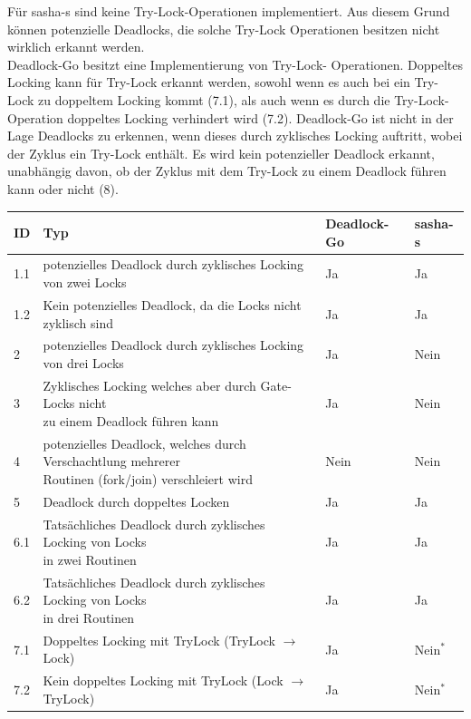 Für sasha-s sind keine Try-Lock-Operationen implementiert. Aus diesem Grund 
können potenzielle Deadlocks, die solche Try-Lock Operationen besitzen nicht 
wirklich erkannt werden.\\Deadlock-Go besitzt eine Implementierung von Try-Lock-
Operationen. Doppeltes Locking kann für Try-Lock erkannt werden, sowohl wenn 
es auch bei ein Try-Lock zu doppeltem Locking kommt (7.1), als auch wenn es
durch die Try-Lock-Operation doppeltes Locking verhindert wird (7.2). Deadlock-Go
ist nicht in der Lage Deadlocks zu erkennen, wenn dieses durch zyklisches Locking 
auftritt, wobei der Zyklus ein Try-Lock enthält. Es wird kein potenzieller
Deadlock erkannt, unabhängig davon, ob der Zyklus mit dem Try-Lock zu einem  
Deadlock führen kann oder nicht (8).


\begin{table}[H]
\centering
\begin{tabular}{|l|l|l|l|}
    \hline
    \textbf{ID} & \textbf{Typ} & \textbf{Deadlock-Go} & \textbf{sasha-s} \\ \hline
    1.1 & potenzielles Deadlock durch zyklisches Locking von zwei Locks & Ja & Ja \\ \hline
    1.2 & Kein potenzielles Deadlock, da die Locks nicht zyklisch sind & Ja & Ja \\ \hline
    2 & potenzielles Deadlock durch zyklisches Locking von drei Locks & Ja & Nein \\ \hline
    3 & \makecell[l]{Zyklisches Locking welches aber durch Gate-Locks nicht\\zu einem Deadlock führen kann} & Ja & Nein \\ \hline
    4 & \makecell[l]{potenzielles Deadlock, welches durch Verschachtlung mehrerer\\Routinen (fork/join) verschleiert wird} & Nein & Nein \\ \hline
    5 & Deadlock durch doppeltes Locken & Ja & Ja \\ \hline
    6.1 & \makecell[l]{Tatsächliches Deadlock durch zyklisches Locking von Locks\\in zwei Routinen} & Ja & Ja \\ \hline
    6.2 & \makecell[l]{Tatsächliches Deadlock durch zyklisches Locking von Locks\\in drei Routinen} & Ja & Ja \\ \hline
    7.1 & Doppeltes Locking mit TryLock (TryLock $\to$ Lock) & Ja & Nein$^*$ \\ \hline
    7.2 & Kein doppeltes Locking mit TryLock (Lock $\to$ TryLock) & Ja & Nein$^*$\\ \hline

\end{tabular}
\end{table}
